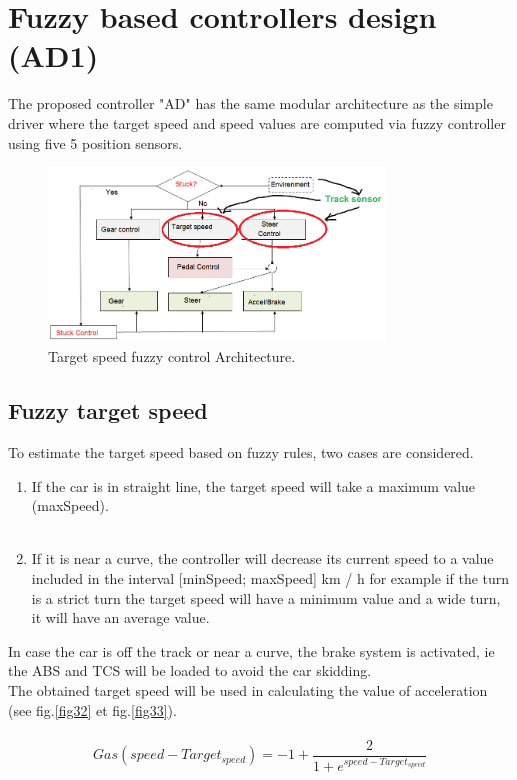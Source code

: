 \documentclass{llncs}
\begin{document}
\section{Fuzzy based controllers design (AD1)}
The proposed controller "AD" has the same modular architecture as the simple driver where the target speed  and speed values are  computed via fuzzy controller using five 5 position sensors.
\begin{figure}[h!]
	
	\centering
	\includegraphics[width=0.8\textwidth]{fig/speedcible3.png}
	\begin{minipage}{10cm}
		\centering
		\caption{\footnotesize Target speed fuzzy control Architecture.}
		\label{archi2}
	\end{minipage} 
\end{figure}
\subsection{Fuzzy target speed}
To estimate the target speed  based on fuzzy rules, two cases are considered.
\begin{enumerate}
	\item If the car is in straight line, the target speed will take a maximum value (maxSpeed).\\\\
	\item If it is near a curve, the controller will decrease its current speed to a value included in the interval [minSpeed; maxSpeed] km / h for example if the turn is a strict turn the target speed will have a minimum value and a wide turn, it will have an average value.
	
\end{enumerate}
In case the car is off the track or near a curve, the brake system is activated, ie the ABS and TCS will be loaded to avoid the car skidding.
\\
The obtained target speed will be used in calculating the value of acceleration
(see fig.\ref{fig32} et fig.\ref{fig33}).
\\\\
\begin{equation}	
Gas(speed-Target_{speed})=-1+\frac{2}{1+e^{speed-Target_{speed}}}	
\end{equation}
\end{document}

